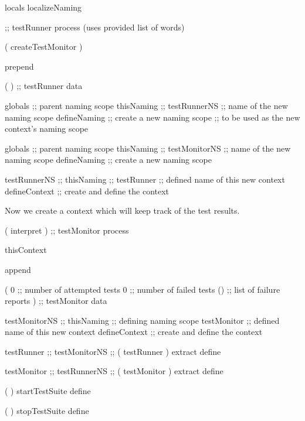 \startJoylolCode

locals
localizeNaming

                 ;; testRunner process (uses provided list of words)
                 
(
  createTestMonitor
)

prepend

( 
)                ;; testRunner data

globals      ;; parent naming scope
thisNaming   ;; 
testRunnerNS ;; name of the new naming scope
defineNaming    ;; create a new naming scope
                 ;; to be used as the new context's naming scope
  
globals        ;; parent naming scope
thisNaming ;;
testMonitorNS  ;; name of the new naming scope
defineNaming   ;; create a new naming scope
          
testRunnerNS ;;
thisNaming ;;
testRunner       ;; defined name of this new context
defineContext    ;; create and define the context

\stopJoylolCode

Now we create a context which will keep track of the test results. 

\startJoylolCode
(
  interpret
) ;; testMonitor process

thisContext

append

( 
  0           ;; number of attempted tests
  0           ;; number of failed tests
  ()          ;; list of failure reports
)             ;; testMonitor data

testMonitorNS ;;
thisNaming    ;; defining naming scope
testMonitor   ;; defined name of this new context
defineContext ;; create and define the context
\stopJoylolCode


\startJoylolCode
testRunner ;;
testMonitorNS ;;
(
  testRunner
) extract
define

testMonitor ;;
testRunnerNS ;;
(
  testMonitor
) extract
define


\stopJoylolCode


\stopTestSuite

\starttyping
{}

\startJoylolCode
  (
  )
  startTestSuite
  define
  
  (
  )
  stopTestSuite
  define
\stopJoylolCode

\stopTestSuite
\stoptyping


